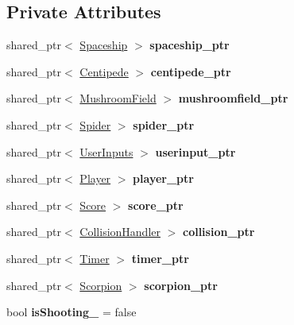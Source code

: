 \subsection*{Private Attributes}
\begin{DoxyCompactItemize}
\item 
\mbox{\label{class_domain_af646a300d0fed78a515e32ce4c14a408}} 
shared\+\_\+ptr$<$ \mbox{\hyperlink{class_spaceship}{Spaceship}} $>$ {\bfseries spaceship\+\_\+ptr}
\item 
\mbox{\label{class_domain_a8c8d5fdedef9d0718f5871feb84f5e6d}} 
shared\+\_\+ptr$<$ \mbox{\hyperlink{class_centipede}{Centipede}} $>$ {\bfseries centipede\+\_\+ptr}
\item 
\mbox{\label{class_domain_a53e2de6c21fd9240da65602de89fdd72}} 
shared\+\_\+ptr$<$ \mbox{\hyperlink{class_mushroom_field}{Mushroom\+Field}} $>$ {\bfseries mushroomfield\+\_\+ptr}
\item 
\mbox{\label{class_domain_aa235276e5a811580fa5a4f5232270e84}} 
shared\+\_\+ptr$<$ \mbox{\hyperlink{class_spider}{Spider}} $>$ {\bfseries spider\+\_\+ptr}
\item 
\mbox{\label{class_domain_a6035ada06530bd88d818d52326e607a4}} 
shared\+\_\+ptr$<$ \mbox{\hyperlink{class_user_inputs}{User\+Inputs}} $>$ {\bfseries userinput\+\_\+ptr}
\item 
\mbox{\label{class_domain_a57c8e0cd4b78399313d0db5e434b51b6}} 
shared\+\_\+ptr$<$ \mbox{\hyperlink{class_player}{Player}} $>$ {\bfseries player\+\_\+ptr}
\item 
\mbox{\label{class_domain_aa55d415c95c3da78da226c39387f28f2}} 
shared\+\_\+ptr$<$ \mbox{\hyperlink{class_score}{Score}} $>$ {\bfseries score\+\_\+ptr}
\item 
\mbox{\label{class_domain_a9362a66fdad1e61fa3ff261ee660e6a8}} 
shared\+\_\+ptr$<$ \mbox{\hyperlink{class_collision_handler}{Collision\+Handler}} $>$ {\bfseries collision\+\_\+ptr}
\item 
\mbox{\label{class_domain_a08b9da8fe2a1d5ef567378ad2ba36c34}} 
shared\+\_\+ptr$<$ \mbox{\hyperlink{class_timer}{Timer}} $>$ {\bfseries timer\+\_\+ptr}
\item 
\mbox{\label{class_domain_a82fe0d3b96c7b89471791f24ae1b0be6}} 
shared\+\_\+ptr$<$ \mbox{\hyperlink{class_scorpion}{Scorpion}} $>$ {\bfseries scorpion\+\_\+ptr}
\item 
\mbox{\label{class_domain_a0a57826049d02cc5eab765c928963396}} 
bool {\bfseries is\+Shooting\+\_\+} = false
\end{DoxyCompactItemize}


